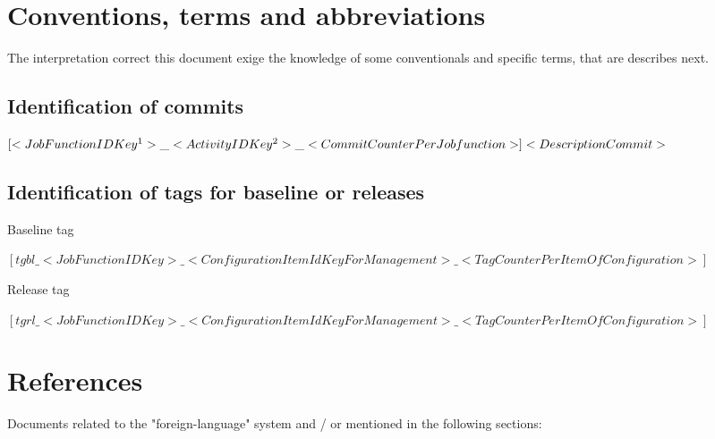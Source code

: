 \documentclass[11pt, twoside, a4paper]{book}
\begin{document}
            \section{Conventions, terms and abbreviations}
                
                The interpretation correct this document exige the knowledge of some conventionals and specific terms, that are describes next.	                
                
                \subsection{Identification of commits}
                	
                	\begin{center}
                		$[<Job Function ID Key\footnote{See section 2.2 for more details}>\_<Activity ID Key\footnote{See section 2.1 for more details}>\_<Commit Counter Per Job function>] <Description Commit>$
                	\end{center}
                
                \subsection{Identification of tags for baseline or releases}

					\begin{center}
						Baseline tag													

            			$[tgbl\_<Job Function ID Key>\_<Configuration Item Id Key For Management>\_<Tag Counter Per Item Of Configuration>]$
					\end{center}					                			

        			\begin{center}
		   				Release tag					        			
        			
            			$[tgrl\_<Job Function ID Key>\_<Configuration Item Id Key For Management>\_<Tag Counter Per Item Of Configuration>]	$	
					\end{center}					                
					
            \section{References}
                    
                    Documents related to the "foreign-language" system and / or mentioned in the following sections:
            
\end{document}
